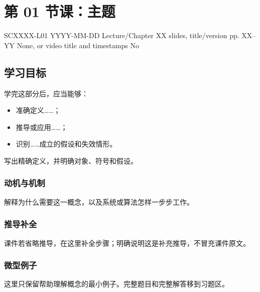 
\section{第 01 节课：主题}\label{lecture:SCXXXX-L01}

\lecturemeta
  {SCXXXX-L01}
  {YYYY-MM-DD}
  {Lecture/Chapter XX slides, title/version}
  {pp. XX--YY}
  {None, or video title and timestamps}
  {No}

\subsection{学习目标}

学完这部分后，应当能够：

\begin{itemize}
  \item 准确定义……；
  \item 推导或应用……；
  \item 识别……成立的假设和失效情形。
\end{itemize}



\begin{definition}
  写出精确定义，并明确对象、符号和假设。
\end{definition}

\subsubsection{动机与机制}

解释为什么需要这一概念，以及系统或算法怎样一步步工作。

\subsubsection{推导补全}

课件若省略推导，在这里补全步骤；明确说明这是补充推导，不冒充课件原文。

\subsubsection{微型例子}

这里只保留帮助理解概念的最小例子。完整题目和完整解答移到习题区。

